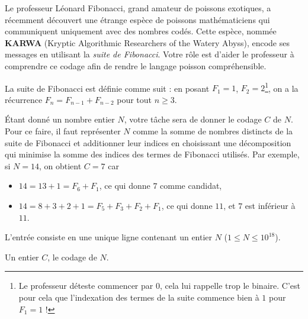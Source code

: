 \problemname{}


Le professeur Léonard Fibonacci, grand amateur de poissons exotiques, a récemment découvert une étrange espèce de poissons mathématiciens qui communiquent uniquement avec des nombres codés. Cette espèce, nommée \textbf{KARWA} (Kryptic Algorithmic Researchers of the Watery Abyss), encode ses messages en utilisant la \textit{suite de Fibonacci}. Votre rôle est d'aider le professeur à comprendre ce codage afin de rendre le langage poisson compréhensible.

La suite de Fibonacci est définie comme suit : en posant $F_1 = 1$, $F_2 = 2$\footnote{Le professeur déteste commencer par $0$, cela lui rappelle trop le binaire. C'est pour cela que l'indexation des termes de la suite commence bien à $1$ pour $F_1 = 1$ !}, on a la récurrence $F_n = F_{n-1} + F_{n-2}$ pour tout $n \geq 3$.

Étant donné un nombre entier $N$, votre tâche sera de donner le codage $C$ de $N$. Pour ce faire, il faut représenter $N$ comme la somme de nombres distincts de la suite de Fibonacci et additionner leur indices en choisissant une décomposition qui minimise la somme des indices des termes de Fibonacci utilisés. Par exemple, si $N = 14$, on obtient $C = 7$ car
\begin{itemize}
    \item $14 = 13 + 1 = F_6 + F_1$, ce qui donne $7$ comme candidat,
    \item $14 = 8 + 3 + 2 + 1 = F_5 + F_3 + F_2 + F_1$, ce qui donne $11$, et $7$ est inférieur à $11$.
\end{itemize}

\begin{Input}
    L'entrée consiste en une unique ligne contenant un entier $N$ ($1 \leq N \leq 10^{18}$).
\end{Input}

\begin{Output}
    Un entier $C$, le codage de $N$.
\end{Output}
